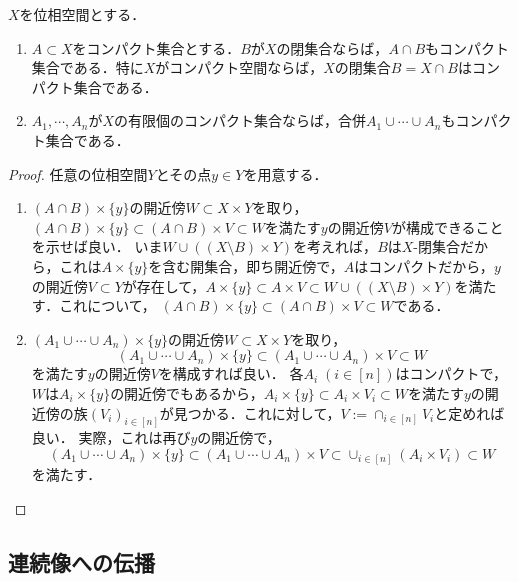 \documentclass[uplatex,dvipdfmx]{jsreport}
\begin{document}
\begin{corollary}\label{cor-union-intersection-of-compact-sets-is-compact}
    $X$を位相空間とする．
    \begin{enumerate}
        \item $A\subset X$をコンパクト集合とする．$B$が$X$の閉集合ならば，$A\cap B$もコンパクト集合である．特に$X$がコンパクト空間ならば，$X$の閉集合$B=X\cap B$はコンパクト集合である．
        \item $A_1,\cdots,A_n$が$X$の有限個のコンパクト集合ならば，合併$A_1\cup\cdots\cup A_n$もコンパクト集合である．
    \end{enumerate}
\end{corollary}
\begin{proof}
    任意の位相空間$Y$とその点$y\in Y$を用意する．
    \begin{enumerate}
        \item $(A\cap B)\times\{y\}$の開近傍$W\subset X\times Y$を取り，$(A\cap B)\times\{y\}\subset (A\cap B)\times V\subset W$を満たす$y$の開近傍$V$が構成できることを示せば良い．
        いま$W\cup((X\setminus B)\times Y)$を考えれば，$B$は$X$-閉集合だから，これは$A\times\{y\}$を含む開集合，即ち開近傍で，$A$はコンパクトだから，$y$の開近傍$V\subset Y$が存在して，$A\times\{y\}\subset A\times V\subset W\cup((X\setminus B)\times Y)$を満たす．これについて，
        $(A\cap B)\times\{y\}\subset(A\cap B)\times V\subset W$である．
        \item 
        $(A_1\cup\cdots\cup A_n)\times\{y\}$の開近傍$W\subset X\times Y$を取り，
        \[(A_1\cup\cdots\cup A_n)\times\{y\}\subset (A_1\cup\cdots\cup A_n)\times V\subset W\]
        を満たす$y$の開近傍$V$を構成すれば良い．
        各$A_i\;(i\in[n])$はコンパクトで，$W$は$A_i\times\{y\}$の開近傍でもあるから，$A_i\times\{y\}\subset A_i\times V_i\subset W$を満たす$y$の開近傍の族$(V_i)_{i\in[n]}$が見つかる．これに対して，$V:=\cap_{i\in[n]}V_i$と定めれば良い．
        実際，これは再び$y$の開近傍で，
        \[(A_1\cup\cdots\cup A_n)\times\{y\}\subset (A_1\cup\cdots\cup A_n)\times V\subset\cup_{i\in[n]}(A_i\times V_i)\subset W\]
        を満たす．
    \end{enumerate}
\end{proof}

\subsection{連続像への伝播}
\end{document}
